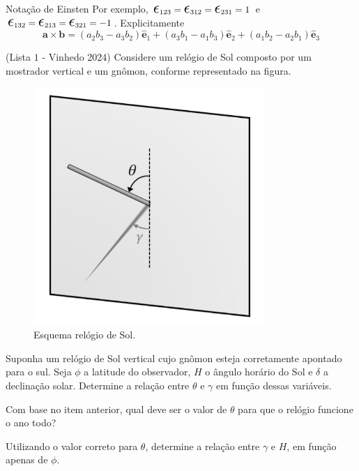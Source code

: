 \documentclass[11pt]{article}
\begin{document}
\begin{pproblem}
\begin{psidea}{Notação de Einsten}{}
            Por exemplo, \(\Epsilon_{123} = \Epsilon_{312} = \Epsilon_{231} = 1\) e \(\Epsilon_{132} = \Epsilon_{213} = \Epsilon_{321} = -1\).
            Explicitamente 
            \[\mathbf{a} \times \mathbf{b} = (a_2b_3-a_3b_2)\hat{\mathbf{e}}_1 +(a_3b_1-a_1b_3)\hat{\mathbf{e}}_2+(a_1b_2-a_2b_1)\hat{\mathbf{e}}_3\]
        \end{psidea}
    \end{pproblem}

\begin{pproblem} (Lista \(1\) - Vinhedo 2024) Considere um relógio de Sol composto por um mostrador vertical
    e um gnômon, conforme representado na figura.
    \begin{figure}[H]
        \centering
        \includegraphics{imagens/q20.png}
        \caption{Esquema relógio de Sol.}
    \end{figure}
    \begin{alternativas}
        \item Suponha um relógio de Sol vertical cujo gnômon esteja corretamente apontado para o sul.
        Seja \(\phi\) a latitude do observador, \(H\) o ângulo horário do Sol e \(\delta\) a declinação solar. Determine
        a relação entre \(\theta\) e \(\gamma\) em função dessas variáveis.
        \item  Com base no item anterior, qual deve ser o valor de \(\theta\) para que o relógio funcione o ano todo?
        \item  Utilizando o valor correto para \(\theta\), determine a relação entre \(\gamma\) e \(H\), em função apenas de \(\phi\).
    \end{alternativas}
\end{pproblem}
\end{document}
